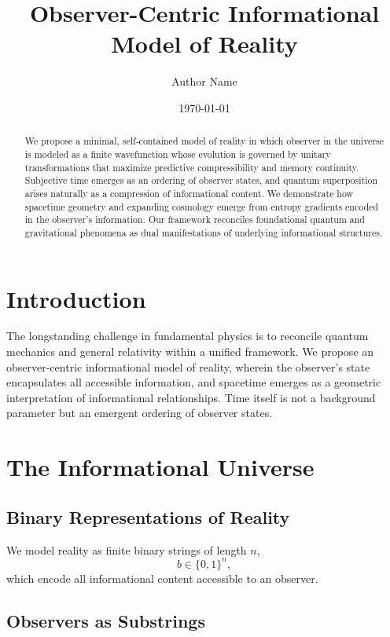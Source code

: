 \documentclass[12pt]{article}
\title{Observer-Centric Informational Model of Reality}
\author{Author Name}
\date{\today}
\begin{document}
\maketitle

\begin{abstract}
      We propose a minimal, self-contained model of reality in which observer in the universe is modeled as a finite wavefunction whose evolution is governed by unitary transformations that maximize predictive compressibility and memory continuity. Subjective time emerges as an ordering of observer states, and quantum superposition arises naturally as a compression of informational content. We demonstrate how spacetime geometry and expanding cosmology emerge from entropy gradients encoded in the observer's information. Our framework reconciles foundational quantum and gravitational phenomena as dual manifestations of underlying informational structures.
\end{abstract}

\section{Introduction}

The longstanding challenge in fundamental physics is to reconcile quantum mechanics and general relativity within a unified framework. We propose an observer-centric informational model of reality, wherein the observer's state encapsulates all accessible information, and spacetime emerges as a geometric interpretation of informational relationships. Time itself is not a background parameter but an emergent ordering of observer states.

\section{The Informational Universe}

\subsection{Binary Representations of Reality}

We model reality as finite binary strings of length \(n\),
\[
      b \in \{0,1\}^n,
\]
which encode all informational content accessible to an observer.

\subsection{Observers as Substrings}
\end{document}
